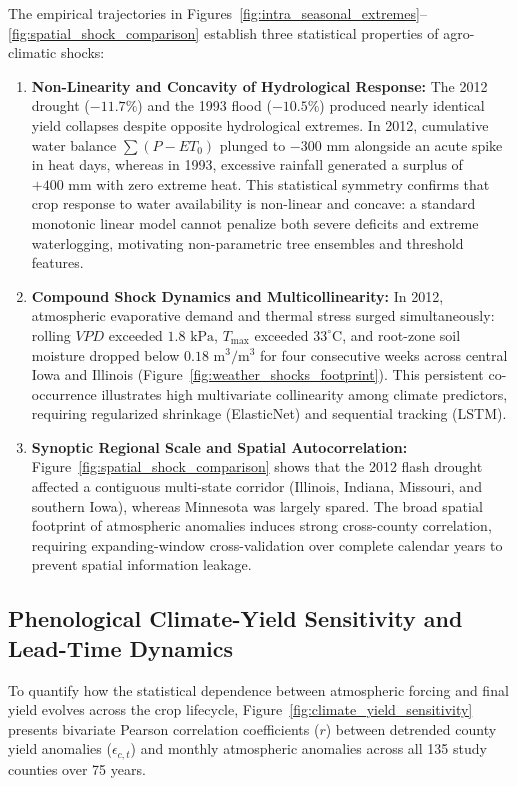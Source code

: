 The empirical trajectories in Figures~\ref{fig:intra_seasonal_extremes}--\ref{fig:spatial_shock_comparison} establish three statistical properties of agro-climatic shocks:
\begin{enumerate}
    \item \textbf{Non-Linearity and Concavity of Hydrological Response:} The 2012 drought ($-11.7\%$) and the 1993 flood ($-10.5\%$) produced nearly identical yield collapses despite opposite hydrological extremes. In 2012, cumulative water balance $\sum (P - ET_0)$ plunged to $-300\text{ mm}$ alongside an acute spike in heat days, whereas in 1993, excessive rainfall generated a surplus of $+400\text{ mm}$ with zero extreme heat. This statistical symmetry confirms that crop response to water availability is non-linear and concave: a standard monotonic linear model cannot penalize both severe deficits and extreme waterlogging, motivating non-parametric tree ensembles and threshold features.
    \item \textbf{Compound Shock Dynamics and Multicollinearity:} In 2012, atmospheric evaporative demand and thermal stress surged simultaneously: rolling $VPD$ exceeded $1.8\text{ kPa}$, $T_{\text{max}}$ exceeded $33^\circ\text{C}$, and root-zone soil moisture dropped below $0.18\text{ m}^3/\text{m}^3$ for four consecutive weeks across central Iowa and Illinois (Figure~\ref{fig:weather_shocks_footprint}). This persistent co-occurrence illustrates high multivariate collinearity among climate predictors, requiring regularized shrinkage (ElasticNet) and sequential tracking (LSTM).
    \item \textbf{Synoptic Regional Scale and Spatial Autocorrelation:} Figure~\ref{fig:spatial_shock_comparison} shows that the 2012 flash drought affected a contiguous multi-state corridor (Illinois, Indiana, Missouri, and southern Iowa), whereas Minnesota was largely spared. The broad spatial footprint of atmospheric anomalies induces strong cross-county correlation, requiring expanding-window cross-validation over complete calendar years to prevent spatial information leakage.
\end{enumerate}

\subsection{Phenological Climate-Yield Sensitivity and Lead-Time Dynamics}
\label{sec:data_pheno_sensitivity}

To quantify how the statistical dependence between atmospheric forcing and final yield evolves across the crop lifecycle, Figure~\ref{fig:climate_yield_sensitivity} presents bivariate Pearson correlation coefficients ($r$) between detrended county yield anomalies ($\epsilon_{c,t}$) and monthly atmospheric anomalies across all 135 study counties over 75 years.

